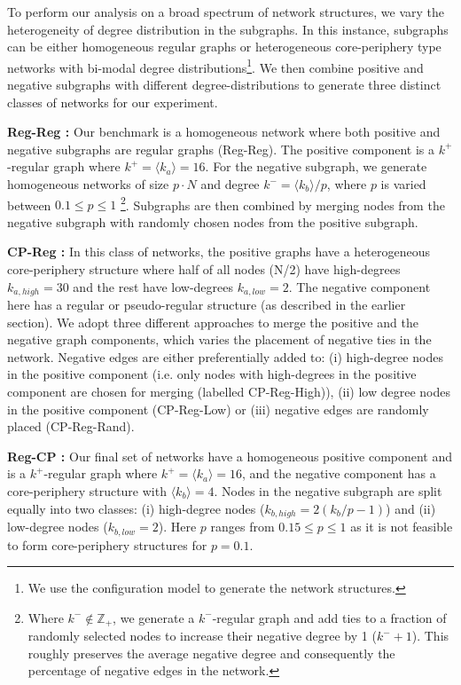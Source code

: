 To perform our analysis on a broad spectrum of network structures, we vary the heterogeneity of degree distribution in the subgraphs. In this instance, subgraphs can be either homogeneous regular graphs \cite{newman2011structure} or heterogeneous core-periphery type networks \cite{rombach2017core} with bi-modal degree distributions\footnote{We use the configuration model \cite{newman2018networks} to generate the network structures.}. We then combine positive and negative subgraphs with different degree-distributions to generate three distinct classes of networks for our experiment.

\textbf{Reg-Reg :} Our benchmark is a homogeneous network where both positive and negative subgraphs are regular graphs (Reg-Reg). The positive component is a $k^+$-regular graph where $k^+=\langle k_{a} \rangle = 16$. For the negative subgraph, we generate homogeneous networks of size $p \cdot N$ and degree $k^- = \langle k_b \rangle / p$, where $p$ is varied between $0.1 \leq p \leq 1$ \footnote{Where $k^{-} \notin \mathbb{Z_+}$, we generate a $k^{-}$-regular graph and add ties to a fraction of randomly selected nodes to increase their negative degree by 1 ($k^{-} + 1$). This roughly preserves the average negative degree and consequently the percentage of negative edges in the network.}. Subgraphs are then combined by merging nodes from the negative subgraph with randomly chosen nodes from the positive subgraph.

\textbf{CP-Reg :} In this class of networks, the positive graphs have a heterogeneous core-periphery structure where half of all nodes (N/2) have high-degrees $k_{a,high} = 30$ and the rest have low-degrees $k_{a,low} = 2$. The negative component here has a regular or pseudo-regular structure (as described in the earlier section). 
We adopt three different approaches to merge the positive and the negative graph components, which varies the placement of negative ties in the network. 
Negative edges are either preferentially added to: (i) high-degree nodes in the positive component (i.e. only nodes with high-degrees in the positive component are chosen for merging (labelled CP-Reg-High)), (ii) low degree nodes in the positive component (CP-Reg-Low) or (iii) negative edges are randomly placed (CP-Reg-Rand).

\textbf{Reg-CP :} Our final set of networks have a homogeneous positive component and is a $k^{+}$-regular graph where $k^{+} = \langle k_{a} \rangle = 16$, and the negative component has a core-periphery structure with $\langle k_{b} \rangle = 4$. Nodes in the negative subgraph are split equally into two classes: (i) high-degree nodes ($k_{b,high} = 2(k_{b}/p-1)$) and (ii) low-degree nodes ($k_{b,low} = 2$). Here $p$ ranges from $0.15 \leq p \leq 1$ as it is not feasible to form core-periphery structures for $p=0.1$.

